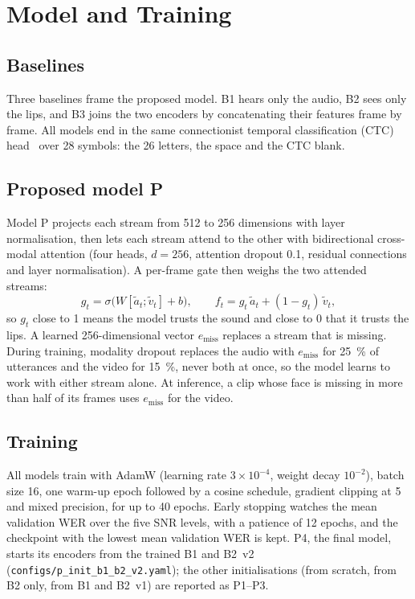 \section{Model and Training}
\label{sec:model}

\subsection{Baselines}
Three baselines frame the proposed model. B1 hears only the audio, B2 sees only the lips, and
B3 joins the two encoders by concatenating their features frame by frame. All models end in
the same connectionist temporal classification (CTC) head~\cite{graves2006} over 28 symbols:
the 26 letters, the space and the CTC blank.

\subsection{Proposed model P}
Model P projects each stream from 512 to 256 dimensions with layer normalisation, then lets
each stream attend to the other with bidirectional cross-modal attention (four heads,
$d = 256$, attention dropout 0.1, residual connections and layer normalisation). A per-frame
gate then weighs the two attended streams:
\begin{equation}
g_t = \sigma\big(W [\tilde{a}_t; \tilde{v}_t] + b\big), \qquad
f_t = g_t\, \tilde{a}_t + (1 - g_t)\, \tilde{v}_t ,
\end{equation}
so $g_t$ close to 1 means the model trusts the sound and close to 0 that it trusts the lips.
A learned 256-dimensional vector $e_{\text{miss}}$ replaces a stream that is missing. During
training, modality dropout replaces the audio with $e_{\text{miss}}$ for 25~\% of utterances
and the video for 15~\%, never both at once, so the model learns to work with either stream
alone. At inference, a clip whose face is missing in more than half of its frames uses
$e_{\text{miss}}$ for the video.

\subsection{Training}
All models train with AdamW (learning rate $3 \times 10^{-4}$, weight decay $10^{-2}$), batch
size 16, one warm-up epoch followed by a cosine schedule, gradient clipping at 5 and mixed
precision, for up to 40 epochs. Early stopping watches the mean validation WER over the five
SNR levels, with a patience of 12 epochs, and the checkpoint with the lowest mean validation
WER is kept. P4, the final model, starts its encoders from the trained B1 and B2~v2
(\texttt{configs/p\_init\_b1\_b2\_v2.yaml}); the other initialisations (from scratch, from B2
only, from B1 and B2~v1) are reported as P1--P3.

